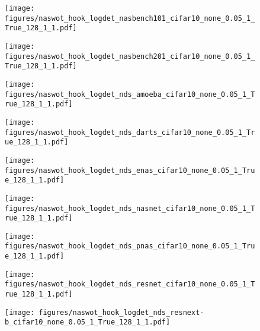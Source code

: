 \documentclass{article}
\begin{document}
\begin{figure*}[!ht]

     \centering
     \begin{subfigure}[b]{0.3\textwidth}
         \centering
         \texttt{[image: figures/naswot\_hook\_logdet\_nasbench101\_cifar10\_none\_0.05\_1\_True\_128\_1\_1.pdf]}
         \caption{}
     \end{subfigure}
     \hfill
     \begin{subfigure}[b]{0.3\textwidth}
         \centering
         \texttt{[image: figures/naswot\_hook\_logdet\_nasbench201\_cifar10\_none\_0.05\_1\_True\_128\_1\_1.pdf]}
         \caption{}
     \end{subfigure}
     \hfill
     \begin{subfigure}[b]{0.3\textwidth}
         \centering
         \texttt{[image: figures/naswot\_hook\_logdet\_nds\_amoeba\_cifar10\_none\_0.05\_1\_True\_128\_1\_1.pdf]}
         \caption{}
     \end{subfigure}

\centering
     \begin{subfigure}[b]{0.3\textwidth}
         \centering
         \texttt{[image: figures/naswot\_hook\_logdet\_nds\_darts\_cifar10\_none\_0.05\_1\_True\_128\_1\_1.pdf]}
         \caption{}
     \end{subfigure}
     \hfill
     \begin{subfigure}[b]{0.3\textwidth}
         \centering
         \texttt{[image: figures/naswot\_hook\_logdet\_nds\_enas\_cifar10\_none\_0.05\_1\_True\_128\_1\_1.pdf]}
         \caption{}
     \end{subfigure}
     \hfill
     \begin{subfigure}[b]{0.3\textwidth}
         \centering
         \texttt{[image: figures/naswot\_hook\_logdet\_nds\_nasnet\_cifar10\_none\_0.05\_1\_True\_128\_1\_1.pdf]}
         \caption{}
     \end{subfigure}

    
\centering
     \begin{subfigure}[b]{0.3\textwidth}
         \centering
         \texttt{[image: figures/naswot\_hook\_logdet\_nds\_pnas\_cifar10\_none\_0.05\_1\_True\_128\_1\_1.pdf]}
         \caption{}
         \label{fig:amoeba}
     \end{subfigure}
     \hfill
     \begin{subfigure}[b]{0.3\textwidth}
         \centering
         \texttt{[image: figures/naswot\_hook\_logdet\_nds\_resnet\_cifar10\_none\_0.05\_1\_True\_128\_1\_1.pdf]}
         \caption{}
         \label{fig:pnas}
     \end{subfigure}
     \hfill
     \begin{subfigure}[b]{0.3\textwidth}
         \centering
         \texttt{[image: figures/naswot\_hook\_logdet\_nds\_resnext-b\_cifar10\_none\_0.05\_1\_True\_128\_1\_1.pdf]}
         \caption{}
         \label{fig:resnet}
     \end{subfigure}
     


\end{figure*}
\end{document}
